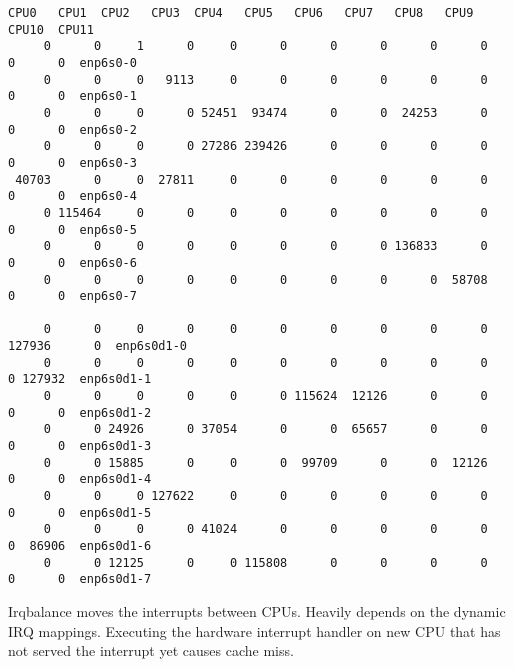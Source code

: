 \begin{lstlisting}[basicstyle=\tiny]
  CPU0   CPU1  CPU2   CPU3  CPU4   CPU5   CPU6   CPU7   CPU8   CPU9   CPU10  CPU11
     0      0     1      0     0      0      0      0      0      0      0      0  enp6s0-0
     0      0     0   9113     0      0      0      0      0      0      0      0  enp6s0-1
     0      0     0      0 52451  93474      0      0  24253      0      0      0  enp6s0-2
     0      0     0      0 27286 239426      0      0      0      0      0      0  enp6s0-3
 40703      0     0  27811     0      0      0      0      0      0      0      0  enp6s0-4
     0 115464     0      0     0      0      0      0      0      0      0      0  enp6s0-5
     0      0     0      0     0      0      0      0 136833      0      0      0  enp6s0-6
     0      0     0      0     0      0      0      0      0  58708      0      0  enp6s0-7

     0      0     0      0     0      0      0      0      0      0 127936      0  enp6s0d1-0
     0      0     0      0     0      0      0      0      0      0      0 127932  enp6s0d1-1
     0      0     0      0     0      0 115624  12126      0      0      0      0  enp6s0d1-2
     0      0 24926      0 37054      0      0  65657      0      0      0      0  enp6s0d1-3
     0      0 15885      0     0      0  99709      0      0  12126      0      0  enp6s0d1-4
     0      0     0 127622     0      0      0      0      0      0      0      0  enp6s0d1-5
     0      0     0      0 41024      0      0      0      0      0      0  86906  enp6s0d1-6
     0      0 12125      0     0 115808      0      0      0      0      0      0  enp6s0d1-7
\end{lstlisting}
Irqbalance moves the interrupts between CPUs.
Heavily depends on the dynamic IRQ mappings.
Executing the hardware interrupt handler on new CPU that has not served the interrupt yet causes cache miss.





\newpage

